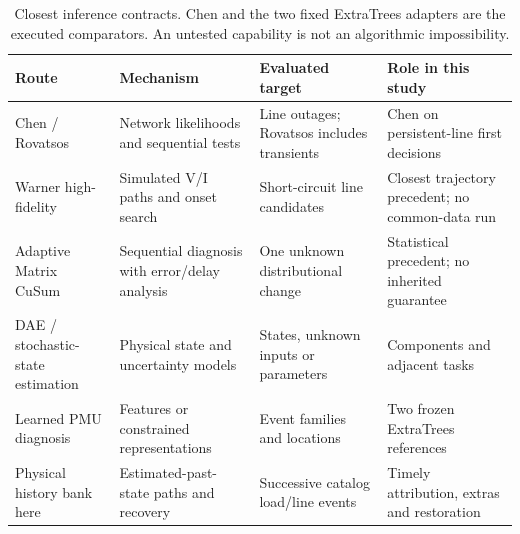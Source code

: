 \begin{table}[t]\centering\small
\caption{Closest inference contracts. Chen and the two fixed ExtraTrees
adapters are the executed comparators. An untested capability is not an
algorithmic impossibility.}
\label{tab:literature-capability}
\begin{tabularx}{\textwidth}{@{}lXXX@{}}\toprule
Route & Mechanism & Evaluated target & Role in this study\\\midrule
Chen / Rovatsos & Network likelihoods and sequential tests & Line outages; Rovatsos includes transients & Chen on persistent-line first decisions\\
Warner high-fidelity & Simulated V/I paths and onset search & Short-circuit line candidates & Closest trajectory precedent; no common-data run\\
Adaptive Matrix CuSum & Sequential diagnosis with error/delay analysis & One unknown distributional change & Statistical precedent; no inherited guarantee\\
DAE / stochastic-state estimation & Physical state and uncertainty models & States, unknown inputs or parameters & Components and adjacent tasks\\
Learned PMU diagnosis & Features or constrained representations & Event families and locations & Two frozen ExtraTrees references\\
Physical history bank here & Estimated-past-state paths and recovery & Successive catalog load/line events & Timely attribution, extras and restoration\\\bottomrule
\end{tabularx}\end{table}
